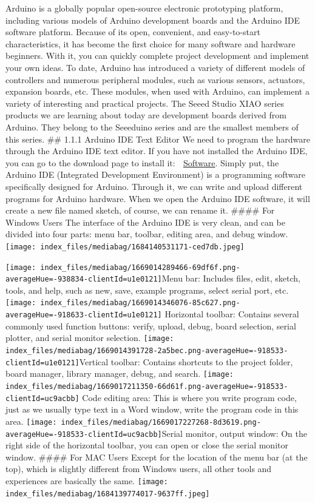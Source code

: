 \documentclass[
  letterpaper,
  DIV=11,
  numbers=noendperiod]{scrreprt}
\begin{document}

Arduino is a globally popular open-source electronic prototyping
platform, including various models of Arduino development boards and the
Arduino IDE software platform. Because of its open, convenient, and
easy-to-start characteristics, it has become the first choice for many
software and hardware beginners. With it, you can quickly complete
project development and implement your own ideas. To date, Arduino has
introduced a variety of different models of controllers and numerous
peripheral modules, such as various sensors, actuators, expansion
boards, etc. These modules, when used with Arduino, can implement a
variety of interesting and practical projects. The Seeed Studio XIAO
series products we are learning about today are development boards
derived from Arduino. They belong to the Seeeduino series and are the
smallest members of this series. \#\# 1.1.1 Arduino IDE Text Editor We
need to program the hardware through the Arduino IDE text editor. If you
have not installed the Arduino IDE, you can go to the download page to
install it: 🔗 \href{https://www.arduino.cc/en/software}{Software}.
Simply put, the Arduino IDE (Integrated Development Environment) is a
programming software specifically designed for Arduino. Through it, we
can write and upload different programs for Arduino hardware. When we
open the Arduino IDE software, it will create a new file named sketch,
of course, we can rename it. \#\#\#\# For Windows Users The interface of
the Arduino IDE is very clean, and can be divided into four parts: menu
bar, toolbar, editing area, and debug window.
\texttt{[image: index\_files/mediabag/1684140531171-ced7db.jpeg]}

\texttt{[image: index\_files/mediabag/1669014289466-69df6f.png-averageHue=-938834-clientId=u1e0121]}Menu
bar: Includes files, edit, sketch, tools, and help, such as new, save,
example programs, select serial port, etc.
\texttt{[image: index\_files/mediabag/1669014346076-85c627.png-averageHue=-918633-clientId=u1e0121]}
Horizontal toolbar: Contains several commonly used function buttons:
verify, upload, debug, board selection, serial plotter, and serial
monitor selection.
\texttt{[image: index\_files/mediabag/1669014391728-2a5bec.png-averageHue=-918533-clientId=u1e0121]}Vertical
toolbar: Contains shortcuts to the project folder, board manager,
library manager, debug, and search.
\texttt{[image: index\_files/mediabag/1669017211350-66d61f.png-averageHue=-918533-clientId=uc9acbb]}
Code editing area: This is where you write program code, just as we
usually type text in a Word window, write the program code in this area.
\texttt{[image: index\_files/mediabag/1669017227268-8d3619.png-averageHue=-918533-clientId=uc9acbb]}Serial
monitor, output window: On the right side of the horizontal toolbar, you
can open or close the serial monitor window. \#\#\#\# For MAC Users
Except for the location of the menu bar (at the top), which is slightly
different from Windows users, all other tools and experiences are
basically the same.
\texttt{[image: index\_files/mediabag/1684139774017-9637ff.jpeg]}
\end{document}
